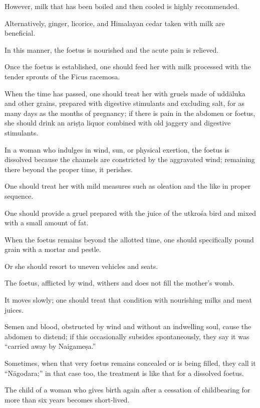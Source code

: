 \begin{translation}
\begin{tt}
However, milk that has been boiled and then cooled is highly
recommended.

\item[65]

Alternatively, ginger, licorice, and Himalayan cedar taken with milk are
beneficial.

In this manner, the foetus is nourished and the acute pain is relieved.

\item[57.2]

Once the foetus is established, one should feed her with milk processed
with the tender sprouts of the Ficus racemosa.

When the time has passed, one should treat her with gruels made of
\gls{uddāluka} and other grains, prepared with digestive stimulants and
excluding salt, for as many days as the months of pregnancy; if there is
pain in the abdomen or foetus, she should drink an \gls{ariṣṭa} liquor
combined with old jaggery and digestive stimulants.

In a woman who indulges in wind, sun, or physical exertion, the foetus
is dissolved because the channels are constricted by the aggravated
wind; remaining there beyond the proper time, it perishes.

One should treat her with mild measures such as oleation and the like in
proper sequence.

One should provide a gruel prepared with the juice of the \gls{utkrośa} bird
and mixed with a small amount of fat.

When the foetus remains beyond the allotted time, one should
specifically pound grain with a mortar and pestle.

Or she should resort to uneven vehicles and seats.

The foetus, afflicted by wind, withers and does not fill the
mother's womb.

It moves slowly; one should treat that condition with nourishing milks
and meat juices.

Semen and blood, obstructed by wind and without an indwelling soul,
cause the abdomen to distend; if this occasionally subsides
spontaneously, they say it was “carried away by Naigameṣa.”

Sometimes, when that very foetus remains concealed or is being filled,
they call it “Nāgodara;” in that case too, the treatment is like that for
a dissolved foetus.

The child of a woman who gives birth again after a cessation of
childbearing for more than six years becomes short-lived.


\end{tt}
\end{translation}
